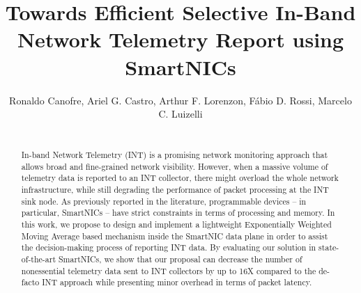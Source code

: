 \documentclass[graybox]{svmult}
\begin{document}
\title*{Towards Efficient Selective In-Band Network Telemetry Report using SmartNICs}


\author{Ronaldo Canofre, Ariel G. Castro, Arthur F. Lorenzon, Fábio D. Rossi, Marcelo C. Luizelli}



\maketitle

\begin{abstract}\\
In-band Network Telemetry (INT) is a promising network monitoring approach that allows broad and fine-grained network visibility. However, when a massive volume of telemetry data is reported to an INT collector, there might overload the whole network infrastructure, while still degrading the performance of packet processing at the INT sink node. As previously reported in the literature,  programmable devices -- in particular, SmartNICs -- have strict constraints in terms of processing and memory. In this work, we propose to design and implement a lightweight Exponentially Weighted Moving Average based mechanism inside the SmartNIC data plane in order to assist the decision-making process of reporting INT data. By evaluating our solution in state-of-the-art SmartNICs, we show that our proposal can decrease the number of nonessential telemetry data sent to INT collectors by up to 16X compared to the de-facto INT approach while presenting minor overhead in terms of packet latency.

\end{abstract}









\vspace{-6mm}


\scriptsize
\vspace{-2mm}



\end{document}
